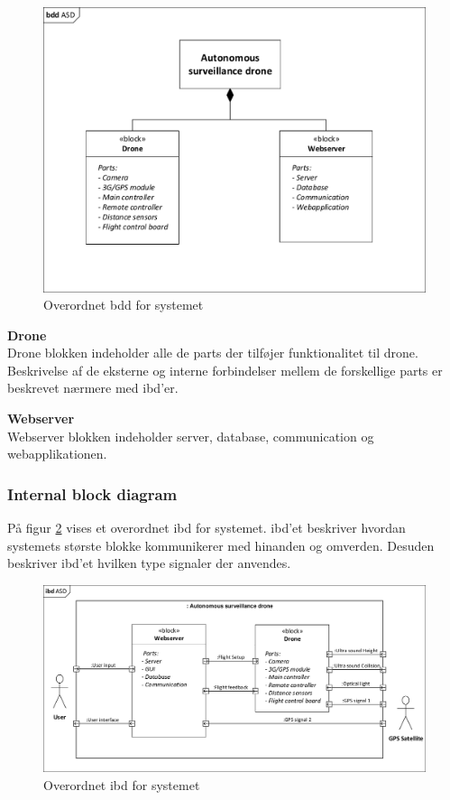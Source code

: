 \begin{figure}[H]
	\centering
	\includegraphics[width=1.0\textwidth]{Billeder/Projektbeskrivelse/bdd_overordnet.pdf}
	\caption{Overordnet bdd for systemet}
	\label{fig:bdd_asd}
\end{figure}

\textbf{Drone} \\
Drone blokken indeholder alle de parts der tilføjer funktionalitet til drone. Beskrivelse af de eksterne og interne forbindelser mellem de forskellige parts er beskrevet nærmere med ibd'er.

\textbf{Webserver} \\
Webserver blokken indeholder server, database, communication og webapplikationen.

\newpage

\subsubsection*{Internal block diagram}
\vspace{-0.3cm}	

På figur \ref{fig:ibd_asd} vises et overordnet ibd for systemet. ibd'et beskriver hvordan systemets største blokke kommunikerer med hinanden og omverden. Desuden beskriver ibd'et hvilken type signaler der anvendes. 

\begin{figure}[H]
	\centering
	\includegraphics[width=1\textwidth]{Billeder/Projektbeskrivelse/ibd1_overordnet.pdf}
	\caption{Overordnet ibd for systemet}
	\label{fig:ibd_asd}
\end{figure}

